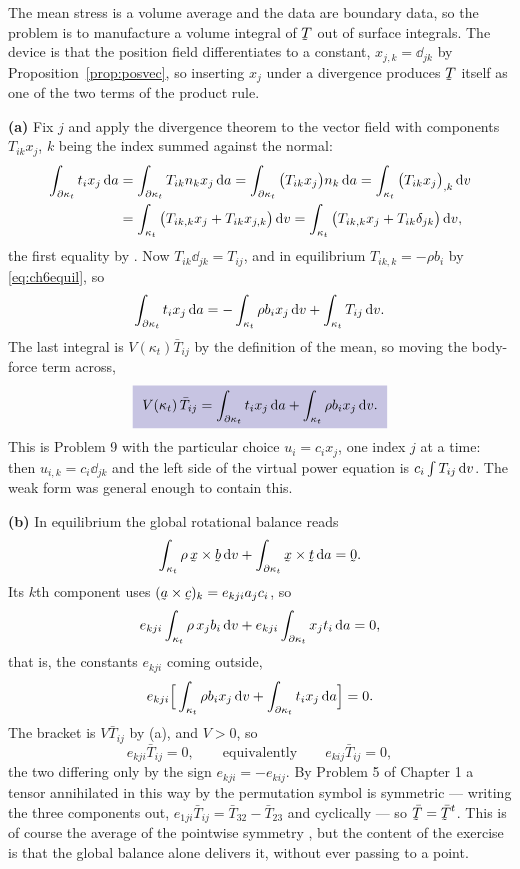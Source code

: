 \begin{solution}
The mean stress is a volume average and the data are boundary data, so
the problem is to manufacture a volume integral of $\bT$ out of surface
integrals. The device is that the position field differentiates to a
constant, $x_{j,k}=\dd_{jk}$ by Proposition~\ref{prop:posvec}, so
inserting $x_{j}$ under a divergence produces $\bT$ itself as one of
the two terms of the product rule.

\medskip
\noindent\textbf{(a)}
Fix $j$ and apply the divergence theorem to the vector field with
components $T_{ik}x_{j}$, $k$ being the index summed against the
normal:
\[
\begin{aligned}
   \int_{\partial\kappa_{t}}t_{i}x_{j}\,\mathrm{d} a
   &=\int_{\partial\kappa_{t}}T_{ik}n_{k}x_{j}\,\mathrm{d} a
    =\int_{\partial\kappa_{t}}\big(T_{ik}x_{j}\big)n_{k}\,\mathrm{d} a
    =\int_{\kappa_{t}}\big(T_{ik}x_{j}\big)_{,k}\,\mathrm{d} v\\
   &=\int_{\kappa_{t}}\big(T_{ik,k}x_{j}+T_{ik}x_{j,k}\big)\,\mathrm{d} v
    =\int_{\kappa_{t}}\big(T_{ik,k}x_{j}+T_{ik}\delta_{jk}\big)\,\mathrm{d} v ,
\end{aligned}
\]
the first equality by . Now $T_{ik}\dd_{jk}=T_{ij}$, and in
equilibrium $T_{ik,k}=-\rho b_{i}$ by \eqref{eq:ch6equil}, so
\[
   \int_{\partial\kappa_{t}}t_{i}x_{j}\,\mathrm{d} a
   =-\int_{\kappa_{t}}\rho b_{i}x_{j}\,\mathrm{d} v
   +\int_{\kappa_{t}}T_{ij}\,\mathrm{d} v .
\]
The last integral is $V(\kappa_{t})\bar T_{ij}$ by the definition of
the mean, so moving the body-force term across,
\[
   \boxed{\ V(\kappa_{t})\,\bar T_{ij}
   =\int_{\partial\kappa_{t}}t_{i}x_{j}\,\dl a
   +\int_{\kappa_{t}}\rho b_{i}x_{j}\,\dl v .\ }
\]
This is Problem 9 with the particular choice $u_{i}=c_{i}x_{j}$, one
index $j$ at a time: then $u_{i,k}=c_{i}\dd_{jk}$ and the left side of
the virtual power equation is $c_{i}\int T_{ij}\,\mathrm{d} v$. The weak form
was general enough to contain this.

\medskip
\noindent\textbf{(b)}
In equilibrium the global rotational balance  reads
\[
   \int_{\kappa_{t}}\rho\,\bx\times\bb\,\dl v
   +\int_{\partial\kappa_{t}}\bx\times\bt\,\dl a=\bze .
\]
Its $k$th component uses $(\ba\times\bc)_{k}=e_{kji}a_{j}c_{i}$, so
\[
   e_{kji}\int_{\kappa_{t}}\rho\,x_{j}b_{i}\,\mathrm{d} v
   +e_{kji}\int_{\partial\kappa_{t}}x_{j}t_{i}\,\mathrm{d} a=0 ,
\]
that is, the constants $e_{kji}$ coming outside,
\[
   e_{kji}\Big[\int_{\kappa_{t}}\rho b_{i}x_{j}\,\mathrm{d} v
   +\int_{\partial\kappa_{t}}t_{i}x_{j}\,\mathrm{d} a\Big]=0 .
\]
The bracket is $V\bar T_{ij}$ by (a), and $V>0$, so
\[
   e_{kji}\bar T_{ij}=0,
   \qquad\text{equivalently}\qquad
   e_{kij}\bar T_{ij}=0 ,
\]
the two differing only by the sign $e_{kji}=-e_{kij}$. By Problem 5 of
Chapter 1 a tensor annihilated in this way by the permutation symbol is
symmetric --- writing the three components out,
$e_{1ji}\bar T_{ij}=\bar T_{32}-\bar T_{23}$ and cyclically --- so
$\bar\bT=\bar\bT^{t}$. This is of course the average of the pointwise
symmetry , but the content of the exercise is that the
global balance alone delivers it, without ever passing to a point.


\end{solution}

